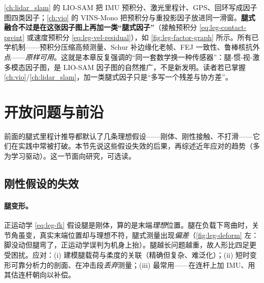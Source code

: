 \begin{insight}\label{ins:leg-multimodal}
\cref{ch:lidar_slam} 的 LIO-SAM 把 IMU 预积分、激光里程计、GPS、回环写成因子图四类因子；\cref{ch:vio} 的 VINS-Mono 把预积分与重投影因子放进同一滑窗。\textbf{腿式融合不过是在这张因子图上再加一类“腿式因子”}（接触预积分 \cref{eq:leg-contact-preint} 或速度预积分 \cref{eq:leg-vel-residual}），如 \cref{fig:leg-factor-graph} 所示。所有已学机制——预积分压缩高频测量、Schur 补边缘化老帧、FEJ 一致性、鲁棒核抗外点——\emph{原样可用}。这就是本章反复强调的“同一套数学换一种传感器”：腿-惯-视-激多模态因子图，是 LIO-SAM 因子图的自然推广，不是新发明。读者若已掌握 \cref{ch:vio}/\cref{ch:lidar_slam}，加一类腿式因子只是“多写一个残差与协方差”。
\end{insight}

\section{开放问题与前沿}
\label{sec:leg-open}

前面的腿式里程计推导都默认了几条理想假设——刚体、刚性接触、不打滑——它们在实践中常被打破。本节先说这些假设失效的后果，再综述近年应对的趋势（多为学习驱动）。这一节面向研究，可选读。

\subsection{刚性假设的失效}
\label{subsec:leg-rigid-fail}

\paragraph{腿变形。}
正运动学 \cref{eq:leg-fk} 假设腿是刚体，算的是末端\emph{理想}位置。腿在负载下弯曲时，关节角虽变，真实末端位置却与理想不符，腿式测量出现\emph{偏差}（\cref{fig:leg-deform} 左：脚没动但腿弯了，正运动学误判为机身上抬）。腿越长问题越重，故人形比四足更受困扰。应对：(i) 建模腿载荷与柔度的关联（精确但复杂、难泛化）；(ii) 短时变形可靠分析力的剖面、在冲击段\emph{丢弃}测量\cite{bloesch2013state}；(iii) 最常用——在连杆上加 IMU、用其估连杆朝向以补偿\cite{carlone2026handbook}。

